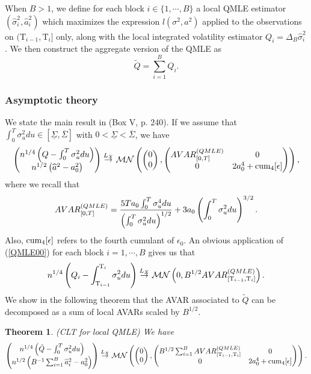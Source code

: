\documentclass[11pt]{article}
\numberwithin{equation}{section}
\newcommand{\Tau}{\mathrm{T}}
\theoremstyle{plain}
\newtheorem{QMLE}[RK0]{Theorem}
\theoremstyle{remark}
\begin{document}
\smallskip
When $B > 1$, we define for each block $i \in \{1,\cdots,B\}$ a local QMLE estimator $(\widehat{\sigma}_i^2, \widehat{a}_i^2)$ which maximizes the expression $l(\sigma^2,a^2)$ applied to the observations on $(\Tau_{i-1},\Tau_i]$ only, along with the local integrated volatility estimator $Q_i = \Delta_B \widehat{\sigma}_i^2$. We then construct the aggregate version of the QMLE as 
$$\tilde{Q} = \sum_{i=1}^B Q_i.$$
 
\subsubsection{Asymptotic theory}
\label{QMLEasymptotictheory}
We state the main result in \cite{xiu2010quasi} (Box V, p. 240). If we assume that $\int_0^T \sigma_u^2 du \in [\underline{\Sigma}, \overline{\Sigma}]$ with $0 < \underline{\Sigma} < \overline{\Sigma}$, we have
\begin{eqnarray}
\label{QMLE00}
\left(\begin{matrix} n^{1/4} \left(Q - \int_0^T \sigma_u^2 du \right) \\ 
n^{1/2} \left( \widehat{a}^2 - a_0^2 \right) 
\end{matrix}\right) \overset{L_X}{\rightarrow} {\cal M}{\cal N} \left( \left(\begin{matrix} 0 \\ 
0 
\end{matrix}\right), \left(\begin{matrix} AVAR_{[0,T]}^{(QMLE)} & 0 \\ 
0 & 2 a_0^4 + \textnormal{cum}_4[\epsilon]
\end{matrix}\right)  \right),
\end{eqnarray}
where we recall that 
$$ AVAR_{[0,T]}^{(QMLE)} =  \frac{ 5 T  a_0 \int_{0}^{T} \sigma_u^4 du}{ \left( \int_{0}^{T} \sigma_u^2 du\right)^{1/2} } + 3 a_0 \left(\int_{0}^{T} \sigma_u^2 du\right)^{3/2}.$$
Also, $\textnormal{cum}_4[\epsilon]$ refers to the fourth cumulant of $\epsilon_0$. An obvious application of (\ref{QMLE00}) for each block $i =1, \cdots, B$ gives us that
$$n^{1/4} \l(Q_i - \int_{\Tau_{i-1}}^{\Tau_i} \sigma_u^2 du \r) \overset{L_X}{\rightarrow} \calm\caln \l(0, B^{1/2} AVAR_{[\Tau_{i-1},\Tau_i]}^{(QMLE)} \r).$$
We show in the following theorem that the AVAR associated to $\tilde{Q}$ can be decomposed as a sum of local AVARs scaled by $B^{1/2}$.
\begin{QMLE} \label{CLTQMLE} (CLT for local QMLE) We have 
$$\left(\begin{matrix} n^{1/4} \l(\tilde{Q} - \int_0^T \sigma_u^2 du \r) \\ 
n^{1/2} \l( B^{-1} \sum_{i=1}^B \widehat{a}_i^2 - a_0^2 \r) 
\end{matrix}\right) \overset{L_X}{\rightarrow} \calm\caln \left( \left(\begin{matrix} 0 \\ 
0 
\end{matrix}\right), \left(\begin{matrix} B^{1/2} \sum_{i=1}^B  AVAR_{[\Tau_{i-1},\Tau_i]}^{(QMLE)} & 0\\ 
0 & 2 a_0^4 + \textnormal{cum}_4[\epsilon]
\end{matrix}\right)  \right).$$
\end{QMLE}
\end{document}
